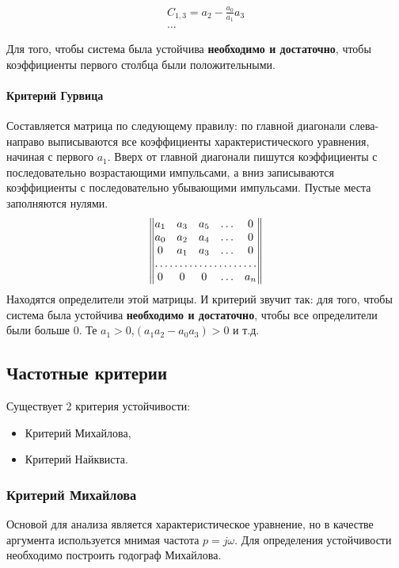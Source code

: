 \begin{gather*}
	C_{1,3}=a_2-\frac{a_0}{a_1}a_3\\
	\ldots
\end{gather*}

Для того, чтобы система была устойчива \textbf{необходимо и достаточно}, чтобы коэффициенты первого столбца были положительными.

\paragraph{Критерий Гурвица}
Составляется матрица по следующему правилу: по главной диагонали слева-направо выписываются все коэффициенты характеристического уравнения, начиная с первого $a_1$. Вверх от главной диагонали пишутся коэффициенты с последовательно возрастающими импульсами, а вниз записываются коэффициенты с последовательно убывающими импульсами. Пустые места заполняются нулями.
$$
\begin{Vmatrix}
	a_1 & a_3 & a_5 & \ldots & 0 \\
	a_0 & a_2 & a_4 & \ldots & 0 \\
	0 & a_1 & a_3 & \ldots & 0 \\
	\hdotsfor{5} \\
	0 & 0 & 0 & \ldots & a_n \\
\end{Vmatrix}
$$
Находятся определители этой матрицы. И критерий звучит так: для того, чтобы система была устойчива \textbf{необходимо и достаточно}, чтобы все определители были больше 0. Те $a_1>0$,$(a_1a_2-a_0a_3)>0$ и т.д.

\subsection{Частотные критерии}
Существует 2 критерия устойчивости:
\begin{itemize}
	\item Критерий Михайлова,
	\item Критерий Найквиста.
\end{itemize}

\subsubsection{Критерий Михайлова}
Основой для анализа является характеристическое уравнение, но в качестве аргумента используется мнимая частота $p=j\omega$. Для определения устойчивости необходимо построить годограф Михайлова.

